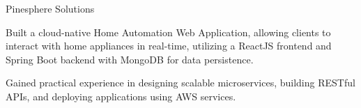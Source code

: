 
   {Pinesphere Solutions} {}
    \resumeItemListStart                
          {
    \item Built a cloud-native Home Automation Web Application, allowing clients to interact with home appliances in real-time, utilizing a ReactJS frontend and Spring Boot backend with MongoDB for data persistence.
  \item Gained practical experience in designing scalable microservices, building RESTful APIs, and deploying applications using AWS services.
  }
\resumeItemListEnd

\resumeSubHeadingListEnd
\vspace{5pt}


